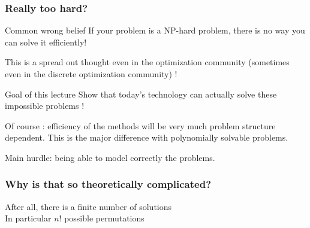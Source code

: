 \documentclass[9pt,handout]{beamer}
\begin{document}
\begin{frame}
\frametitle{Really too hard?}
\begin{block}{Common \alert{wrong} belief}
If your problem is a NP-hard problem, there is no way you can solve it efficiently!\bigskip

This is a spread out thought even in the optimization community (sometimes even in the discrete optimization community) !
\end{block}
\begin{block}{Goal of this lecture}
Show that today's technology can actually \alert{solve these impossible} problems !\bigskip

Of course : efficiency of the methods will be \alert{very much problem structure dependent}.
This is the major difference with polynomially solvable problems.\bigskip

\alert{Main hurdle}: being able to model correctly the problems.
\end{block}
\end{frame}
\begin{frame}
\frametitle{Why is that so theoretically complicated?}
After all, there is a \alert{finite number of solutions}\\
In particular $n!$ possible permutations\bigskip


\end{frame}
\end{document}
